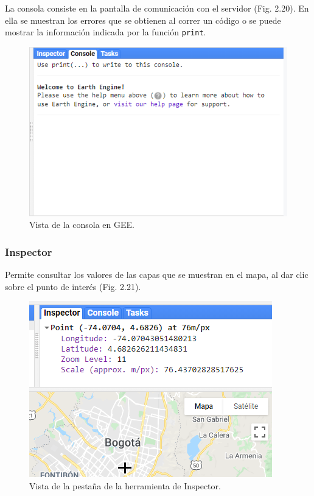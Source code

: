 \documentclass[
  12pt,
  letterpaper,
  twoside]{book}
\begin{document}
La consola consiste en la pantalla de comunicación con el servidor (Fig. 2.20). En ella se muestran los errores que se obtienen al correr un código o se puede mostrar la información indicada por la función \texttt{print}.

\begin{figure}[btp]

{\centering \includegraphics[width=0.8\linewidth]{Img/rigthPanel} 

}

\caption{Vista de la consola en GEE.}\label{fig:unnamed-chunk-21}
\end{figure}

\hypertarget{inspector}{%
\subsubsection*{Inspector}\label{inspector}}

Permite consultar los valores de las capas que se muestran en el mapa, al dar clic sobre el punto de interés (Fig. 2.21).

\begin{figure}[btp]

{\centering \includegraphics[width=0.8\linewidth]{Img/inspector} 

}

\caption{Vista de la pestaña de la herramienta de Inspector.}\label{fig:unnamed-chunk-22}
\end{figure}
\end{document}
